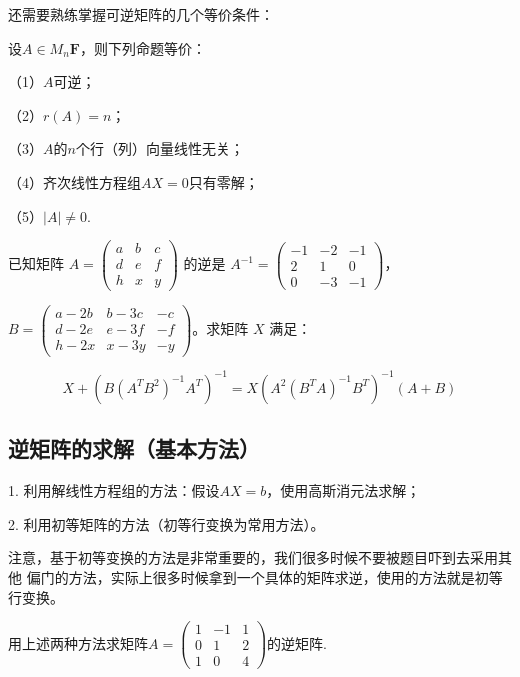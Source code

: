 还需要熟练掌握可逆矩阵的几个等价条件：
\begin{theorem}
	设$A \in M_n{\mathbf{F}}$，则下列命题等价：

	\textup{（1）}$A$可逆；
	
	\textup{（2）}$r(A)=n$；
	
	\textup{（3）}$A$的$n$个行（列）向量线性无关；
	
	\textup{（4）}齐次线性方程组$AX=0$只有零解；
	
	\textup{（5）}$|A|\neq 0$.
\end{theorem}
\begin{example}
	已知矩阵 $A=\begin{pmatrix}a & b & c \\ d & e & f \\ h & x & y\end{pmatrix}$ 的逆是 $A^{-1}=\begin{pmatrix}-1 & -2 & -1 \\ 2 & 1 & 0 \\ 0 & -3 & -1\end{pmatrix}$，

$B=\begin{pmatrix}a-2b & b-3c & -c \\ d-2e & e-3f & -f \\ h-2x & x-3y & -y\end{pmatrix}$。求矩阵 $X$ 满足：

$$X+(B(A^TB^2)^{-1}A^T)^{-1}=X(A^2(B^TA)^{-1}B^T)^{-1}(A+B)$$
\end{example}

\subsection{逆矩阵的求解（基本方法）}
1. 利用解线性方程组的方法：假设$AX=b$，使用高斯消元法求解；

2. 利用初等矩阵的方法（初等行变换为常用方法）。

注意，基于初等变换的方法是非常重要的，我们很多时候不要被题目吓到去采用其他
偏门的方法，实际上很多时候拿到一个具体的矩阵求逆，使用的方法就是初等行变换。

\begin{example}
	用上述两种方法求矩阵$A=\begin{pmatrix}1 & -1 & 1 \\ 0 & 1 & 2 \\ 1 & 0 & 4\end{pmatrix}$的逆矩阵.
\end{example}
